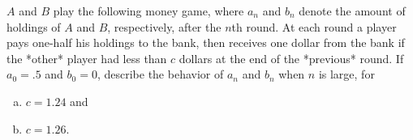 $A$ and $B$ play the following money game, where $a_n$ and $b_n$ denote the
amount of holdings of $A$ and $B$, respectively, after the $n$th round. At each
round a player pays one-half his holdings to the bank, then receives one dollar
from the bank if the *other* player had less than $c$ dollars at the end of the
*previous* round. If $a_0 = .5$ and $b_0 = 0$, describe the behavior of $a_n$
and $b_n$ when $n$ is large, for

\begin{enumerate}[(a)]
\item $c = 1.24$ and
\item $c = 1.26$.
\end{enumerate}
